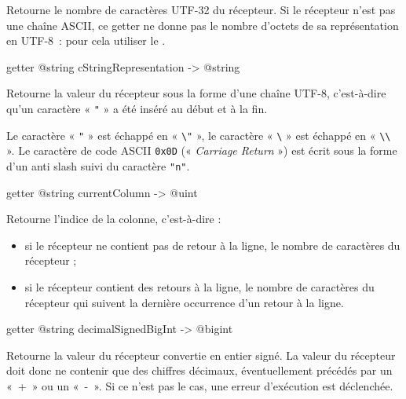 Retourne le nombre de caractères UTF-32 du récepteur. Si le récepteur n'est pas une chaîne ASCII, ce getter ne donne pas le nombre d'octets de sa représentation en UTF-8~: pour cela utiliser le .









\begin{galgas3box}
getter @string cStringRepresentation -> @string
\end{galgas3box}

Retourne la valeur du récepteur sous la forme d'une chaîne UTF-8, c'est-à-dire qu'un caractère « \texttt{"} » a été inséré au début et à la fin.

Le caractère « \texttt{"} » est échappé en « \texttt{\textbackslash"} », le caractère « \texttt{\textbackslash} » est échappé en « \texttt{\textbackslash\textbackslash} ». Le caractère de code ASCII \texttt{0x0D} (« \emph{Carriage Return} ») est écrit sous la forme d'un anti slash suivi du caractère \texttt{"n"}.








\begin{galgas3box}
getter @string currentColumn -> @uint
\end{galgas3box}

Retourne l'indice de la colonne, c'est-à-dire :
\begin{itemize}
\item si le récepteur ne contient pas de retour à la ligne, le nombre de caractères du récepteur ;
\item si le récepteur contient des retours à la ligne, le nombre de caractères du récepteur qui suivent la dernière occurrence d'un retour à la ligne.
\end{itemize}








\begin{galgas3box}
getter @string decimalSignedBigInt -> @bigint
\end{galgas3box}

Retourne la valeur du récepteur convertie en entier signé. La valeur du récepteur doit donc ne contenir que des chiffres décimaux, éventuellement précédés par un «~+~» ou un «~-~». Si ce n'est pas le cas, une erreur d'exécution est déclenchée.

